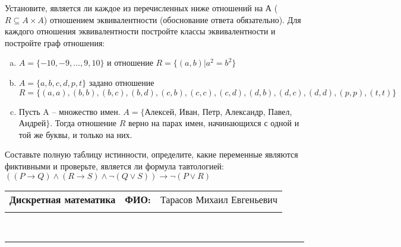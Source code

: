 \documentclass[10pt]{exam}
\newcommand{\class}{Дискретная математика}
\newcommand{\examdate}{}
\begin{document}
\begin{questions}
\question
Установите, является ли каждое из перечисленных ниже отношений на А ($R \subseteq A \times A$) отношением эквивалентности (обоснование ответа обязательно). Для каждого отношения эквивалентности постройте классы 
эквивалентности и постройте граф отношения:
\begin{enumerate} [a)]\setcounter{enumi}{0}
\item $A = \{-10, -9, … , 9, 10\}$ и отношение $R = \{(a,b)|a^{2} = b^{2}\}$
\item $A = \{a, b, c, d, p, t\}$ задано отношение $R = \{(a, a), (b, b), (b, c), (b, d), (c, b), (c, c), (c, d), (d, b), (d, c), (d, d), (p,p), (t,t)\}$
\item Пусть A – множество имен. $A = \{ $Алексей, Иван, Петр, Александр, Павел, Андрей$ \}$. Тогда отношение $R$ верно на парах имен, начинающихся с одной и той же буквы, и только на них.
\end{enumerate}\question Составьте полную таблицу истинности, определите, какие переменные являются фиктивными и проверьте, является ли формула тавтологией:
$((P \rightarrow Q) \land (R \rightarrow S) \land \neg (Q \lor S)) \rightarrow \neg (P \lor R)$

\end{questions}
\newpage
\begin{flushright}
\begin{tabular}{p{2.8in} r l}
\textbf{\class} & \textbf{ФИО:} &Тарасов Михаил Евгеньевич
\\

\textbf{\examdate} &&\\
\end{tabular}\\
\end{flushright}
\rule[1ex]{\textwidth}{.1pt}
\end{document}
